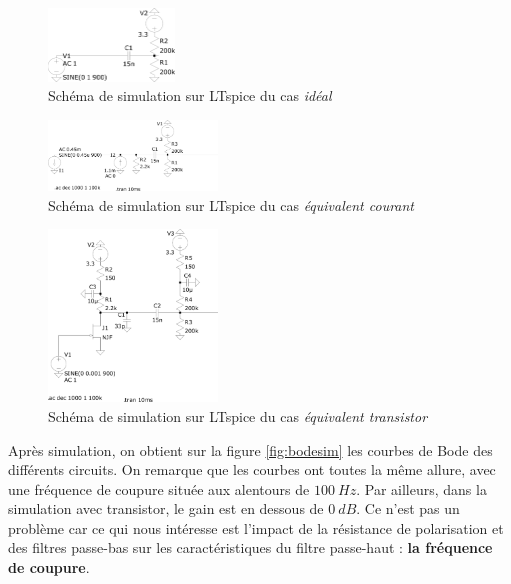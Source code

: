 \begin{figure}[H]
    \centering
    \includegraphics[width=0.3\textwidth]{pdffiles/HighPass/CircuitHighPassPolarization200k.pdf}
    \caption{Schéma de simulation sur LTspice du cas \textit{idéal}}
    \label{fig:ltspice_ideal}
\end{figure}
\begin{figure}[H]
    \centering
    \includegraphics[width=0.4\textwidth]{pdffiles/HighPass/CircuitHighPassSimulationCurrent.pdf}
    \caption{Schéma de simulation sur LTspice du cas \textit{équivalent courant}}
    \label{fig:ltspice_current}
\end{figure}
\begin{figure}[H]
    \centering
    \includegraphics[width=0.4\textwidth]{pdffiles/HighPass/CircuitHighPassSimulationJET.pdf}
    \caption{Schéma de simulation sur LTspice du cas \textit{équivalent transistor}}
    \label{fig:ltspice_transistor}
\end{figure}



Après simulation, on obtient sur la figure \ref{fig:bodesim} les courbes de Bode des différents circuits. On remarque que les courbes ont toutes la même allure, avec une fréquence de coupure située aux alentours de $100 \ Hz$. Par ailleurs, dans la simulation avec transistor, le gain est en dessous de $ 0 \ dB$. Ce n'est pas un problème car ce qui nous intéresse est l'impact de la résistance de polarisation et des filtres passe-bas sur les caractéristiques du filtre passe-haut : \textbf{la fréquence de coupure}.

